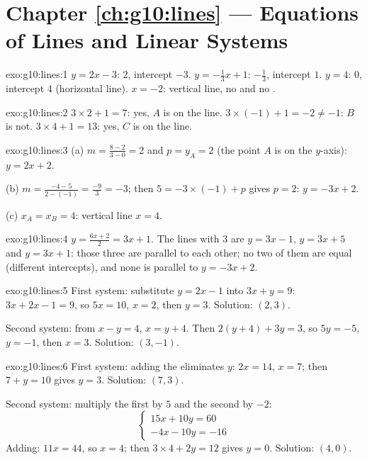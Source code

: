 \section*{Chapter \ref{ch:g10:lines} --- Equations of Lines and Linear Systems}

\begin{solution}{exo:g10:lines:1}
$y = 2x - 3$:  $2$, intercept $-3$.
$y = -\frac13 x + 1$:  $-\frac13$, intercept $1$.
$y = 4$:  $0$, intercept $4$ (horizontal line).
$x = -2$: vertical line, no  and no .
\end{solution}

\begin{solution}{exo:g10:lines:2}
$3 \times 2 + 1 = 7$: yes, $A$ is on the line.
$3 \times (-1) + 1 = -2 \neq -1$: $B$ is not.
$3 \times 4 + 1 = 13$: yes, $C$ is on the line.
\end{solution}

\begin{solution}{exo:g10:lines:3}
(a) $m = \frac{8 - 2}{3 - 0} = 2$ and $p = y_A = 2$ (the point $A$ is on
the $y$-axis): $y = 2x + 2$.

(b) $m = \frac{-4 - 5}{2 - (-1)} = \frac{-9}{3} = -3$; then
$5 = -3 \times (-1) + p$ gives $p = 2$: $y = -3x + 2$.

(c) $x_A = x_B = 4$: vertical line $x = 4$.
\end{solution}

\begin{solution}{exo:g10:lines:4}
$y = \frac{6x+2}{2} = 3x + 1$. The lines with  $3$ are $y = 3x - 1$,
$y = 3x + 5$ and $y = 3x + 1$: those three are parallel to each other;
no two of them are equal (different intercepts), and none is parallel to
$y = -3x + 2$.
\end{solution}

\begin{solution}{exo:g10:lines:5}
First system: substitute $y = 2x - 1$ into $3x + y = 9$:
$3x + 2x - 1 = 9$, so $5x = 10$, $x = 2$, then $y = 3$. Solution:
$(2, 3)$.

Second system: from $x - y = 4$, $x = y + 4$. Then
$2(y + 4) + 3y = 3$, so $5y = -5$, $y = -1$, then $x = 3$. Solution:
$(3, -1)$.
\end{solution}

\begin{solution}{exo:g10:lines:6}
First system: adding the  eliminates $y$: $2x = 14$, $x = 7$;
then $7 + y = 10$ gives $y = 3$. Solution: $(7, 3)$.

Second system: multiply the first  by $5$ and the second by $-2$:
\[
\begin{cases}
15x + 10y = 60 \\
-4x - 10y = -16
\end{cases}
\]
Adding: $11x = 44$, so $x = 4$; then $3 \times 4 + 2y = 12$ gives
$y = 0$. Solution: $(4, 0)$.
\end{solution}

